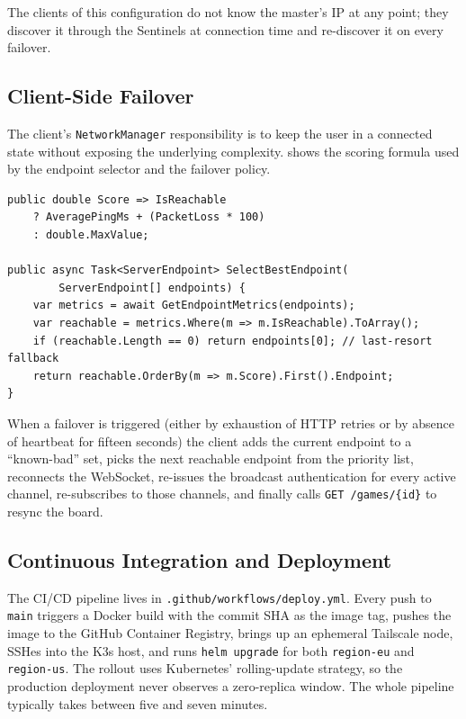 \documentclass{scrartcl}
\begin{document}
The clients of this configuration do not know the master's IP at any
point; they discover it through the Sentinels at connection time and
re-discover it on every failover.

\subsection{Client-Side Failover}

The client's \texttt{NetworkManager} responsibility
 is to keep the user in a connected state without
exposing the underlying complexity.  shows the scoring
formula used by the endpoint selector and the failover policy.

\begin{lstlisting}[language={[Sharp]C},caption={Endpoint scoring and
selection. The penalty term $100 \cdot \text{loss}$ heavily punishes
unreliable endpoints even when their average latency is good; an
unreachable endpoint is given $\texttt{double.MaxValue}$ so it is
always sorted last.},label={lst:endpoint}]
public double Score => IsReachable
    ? AveragePingMs + (PacketLoss * 100)
    : double.MaxValue;

public async Task<ServerEndpoint> SelectBestEndpoint(
        ServerEndpoint[] endpoints) {
    var metrics = await GetEndpointMetrics(endpoints);
    var reachable = metrics.Where(m => m.IsReachable).ToArray();
    if (reachable.Length == 0) return endpoints[0]; // last-resort fallback
    return reachable.OrderBy(m => m.Score).First().Endpoint;
}
\end{lstlisting}

When a failover is triggered (either by exhaustion of HTTP retries or
by absence of heartbeat for fifteen seconds) the client adds the
current endpoint to a ``known-bad'' set, picks the next reachable
endpoint from the priority list, reconnects the WebSocket, re-issues
the broadcast authentication for every active channel, re-subscribes
to those channels, and finally calls \texttt{GET /games/\{id\}} to
resync the board.

\subsection{Continuous Integration and Deployment}

The CI/CD pipeline lives in
\texttt{.github/workflows/deploy.yml}. Every push to \texttt{main}
triggers a Docker build with the commit SHA as the image tag, pushes
the image to the GitHub Container Registry, brings up an ephemeral
Tailscale node, SSHes into the K3s host, and runs
\texttt{helm upgrade} for both \texttt{region-eu} and
\texttt{region-us}. The rollout uses Kubernetes' rolling-update
strategy, so the production deployment never observes a zero-replica
window. The whole pipeline typically takes between five and seven
minutes.
\end{document}
